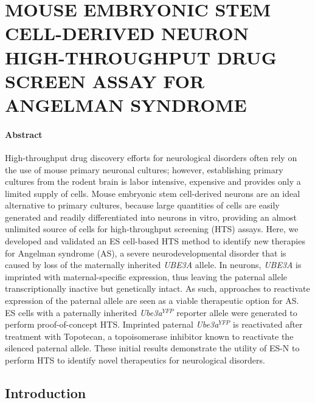 
\chapter{\uppercase {Mouse embryonic stem cell-derived neuron high-throughput drug screen assay for Angelman syndrome}}

\subsubsection*{Abstract}

High-throughput drug discovery efforts for neurological disorders often rely on the use of mouse primary neuronal cultures; however, establishing primary cultures from the rodent brain is labor intensive, expensive and provides only a limited supply of cells. Mouse embryonic stem cell-derived neurons are an ideal alternative to primary cultures, because large quantities of cells are easily generated and readily differentiated into neurons in vitro, providing an almost unlimited source of cells for high-throughput screening (HTS) assays. Here, we developed and validated an ES cell-based HTS method to identify new therapies for Angelman syndrome (AS), a severe neurodevelopmental disorder that is caused by loss of the maternally inherited \textit{UBE3A} allele. In neurons, \textit{UBE3A} is imprinted with maternal-specific expression, thus leaving the paternal allele transcriptionally inactive but genetically intact. As such, approaches to reactivate expression of the paternal allele are seen as a viable therapeutic option for AS. ES cells with a paternally inherited \textit{Ube3a$^{YFP}$} reporter allele were generated to perform proof-of-concept HTS. Imprinted paternal \textit{Ube3a$^{YFP}$} is reactivated after treatment with Topotecan, a topoisomerase inhibitor known to reactivate the silenced paternal allele. These initial results demonstrate the utility of ES-N to perform HTS to identify novel therapeutics for neurological disorders.

\section{Introduction}

